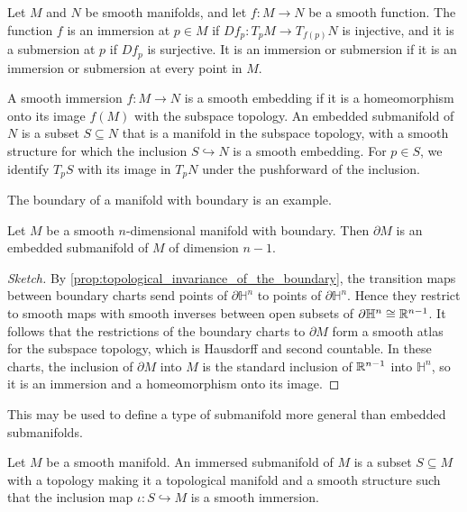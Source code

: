 \documentclass[a4paper,12pt]{article}
\begin{document}
\begin{definition}\label{def:immersion_and_submersion}
    Let $M$ and $N$ be smooth manifolds, and let $f \colon M \to N$ be a smooth function.
    The function $f$ is an immersion at $p \in M$ if $Df_p \colon T_p M \to T_{f(p)} N$ is injective, and it is a submersion at $p$ if $Df_p$ is surjective.
    It is an immersion or submersion if it is an immersion or submersion at every point in $M$.
\end{definition}
\begin{definition}\label{def:embedded_submanifold}
    A smooth immersion $f \colon M \to N$ is a smooth embedding if it is a homeomorphism onto its image $f(M)$ with the subspace topology.
    An embedded submanifold of $N$ is a subset $S \subseteq N$ that is a manifold in the subspace topology, with a smooth structure for which the inclusion $S \hookrightarrow N$ is a smooth embedding.
    For $p \in S$, we identify $T_p S$ with its image in $T_p N$ under the pushforward of the inclusion.
\end{definition}
The boundary of a manifold with boundary is an example.
\begin{proposition}\label{prop:boundary_is_embedded_submanifold}
    Let $M$ be a smooth $n$-dimensional manifold with boundary.
    Then $\partial M$ is an embedded submanifold of $M$ of dimension $n - 1$.
\end{proposition}
\begin{proof}[Sketch]
    By \cref{prop:topological_invariance_of_the_boundary}, the transition maps between boundary charts send points of $\partial \mathbb{H}^n$ to points of $\partial \mathbb{H}^n$.
    Hence they restrict to smooth maps with smooth inverses between open subsets of $\partial \mathbb{H}^n \cong \mathbb{R}^{n-1}$.
    It follows that the restrictions of the boundary charts to $\partial M$ form a smooth atlas for the subspace topology, which is Hausdorff and second countable.
    In these charts, the inclusion of $\partial M$ into $M$ is the standard inclusion of $\mathbb{R}^{n-1}$ into $\mathbb{H}^n$, so it is an immersion and a homeomorphism onto its image.
\end{proof}
This may be used to define a type of submanifold more general than embedded submanifolds.
\begin{definition}\label{def:immersed_submanifold}
    Let $M$ be a smooth manifold.
    An immersed submanifold of $M$ is a subset $S \subseteq M$ with a topology making it a topological manifold and a smooth structure such that the inclusion map $\iota \colon S \hookrightarrow M$ is a smooth immersion.
\end{definition}
\end{document}
